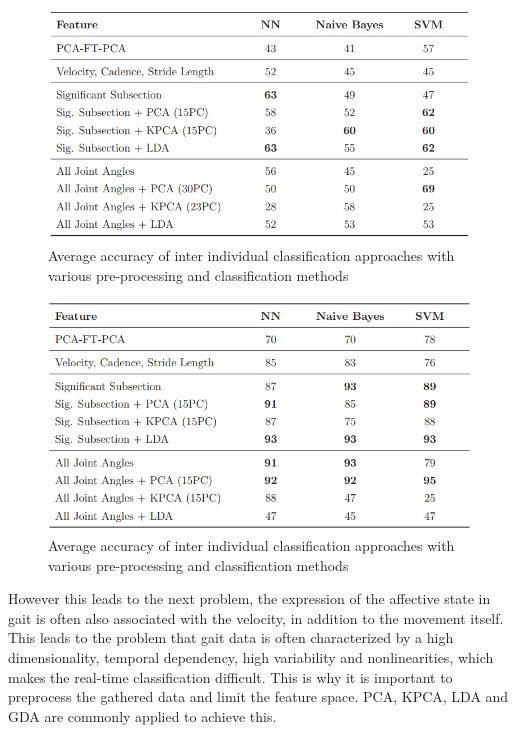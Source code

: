 \documentclass[conference]{IEEEtran}
\begin{document}
\begin{figure}
\centering
\includegraphics[width=\linewidth]{interIndividualClassification.jpg}
\caption{Average accuracy of inter individual classification approaches with various pre-processing and classification methods\cite{karg2012pattern}}
\label{fig:interIndividualClassification}
\end{figure}

\begin{figure}
\centering
\includegraphics[width=\linewidth]{personDependantClassification.jpg}
\caption{Average accuracy of inter individual classification approaches with various pre-processing and classification methods\cite{karg2012pattern}}
\label{fig:personDependantClassification}
\end{figure}
However this leads to the next problem, the expression of the affective state in gait is often also associated with the velocity\cite{crane2007motion,pollick2001perceiving,roether2009critical}, in addition to the movement itself. This leads to the problem that gait data is often characterized by a high dimensionality, temporal dependency, high variability and nonlinearities\cite{karg2012pattern}, which makes the real-time classification difficult. This is why it is important to preprocess the gathered data and limit the feature space. PCA, KPCA, LDA and GDA are commonly applied\cite{karg2012pattern} to achieve this.\
\end{document}
